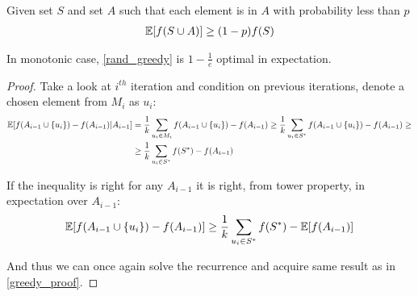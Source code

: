 \begin{prop}
	Given set $S$ and set $A$ such that each element is in $A$ with probability less than $p$
	\begin{align}
	\mathbb{E} \qty[f(S\cup A)] \geq (1-p)f(S)
	\end{align}
\end{prop}
\begin{theorem}
	In monotonic case, \cref{rand_greedy} is $1-\frac{1}{e}$ optimal in expectation.
	\begin{proof}
		Take a look at $i^{th}$ iteration and condition on previous iterations, denote a chosen element from $M_i$ as $u_i$:
		\begin{align}
		\mathbb{E} \qty[f(A_{i-1} \cup \qty{u_i}) - f(A_{i-1}) | A_{i-1} ] &= \frac{1}{k} \sum_{u_i \in M_i} f(A_{i-1} \cup \qty{u_i}) - f(A_{i-1}) \geq \frac{1}{k} \sum_{u_i \in S^*} f(A_{i-1} \cup \qty{u_i}) - f(A_{i-1}) \geq\\&\geq \frac{1}{k} \sum_{u_i \in S^*} f(S^*) - f(A_{i-1})
		\end{align}
		
		If the inequality is right for any $A_{i-1}$ it is right, from tower property, in expectation over $A_{i-1}$:
		\begin{align}
		\mathbb{E} \qty[f(A_{i-1} \cup \qty{u_i}) - f(A_{i-1}) ] \geq 	\frac{1}{k} \sum_{u_i \in S^*} f(S^*) - \mathbb{E} \qty[ f(A_{i-1})]
		\end{align}
		
		And thus we can once again solve the recurrence and acquire same result as in \cref{greedy_proof}.
	\end{proof}
\end{theorem}
